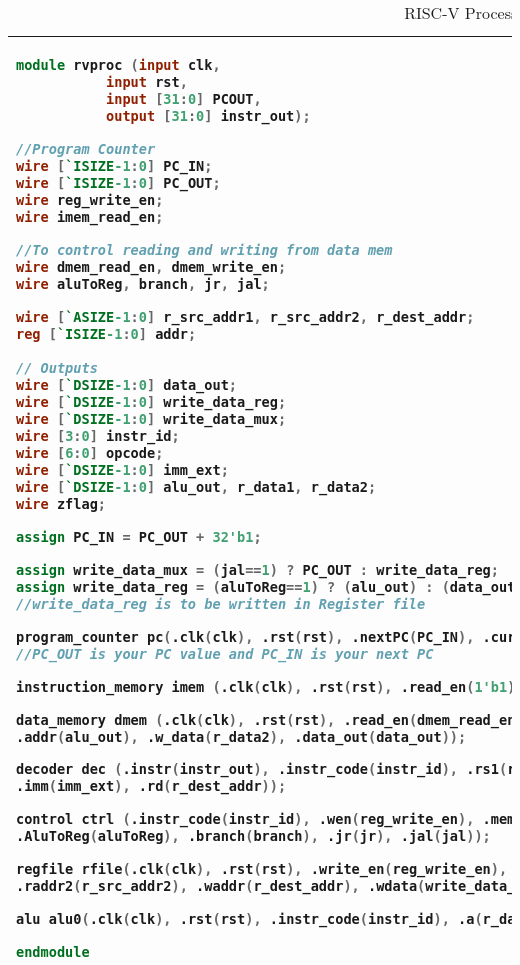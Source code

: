 \begin{table}[!h]
\centering
\caption{RISC-V Processor Top Level Unit}
\label{mem.tbl}
\begin{tabular}{l}
\toprule
\begin{lstlisting}[columns=fullflexible, language=Verilog]
module rvproc (input clk,
	       input rst,
	       input [31:0] PCOUT,
	       output [31:0] instr_out);

//Program Counter
wire [`ISIZE-1:0] PC_IN;
wire [`ISIZE-1:0] PC_OUT;
wire reg_write_en;
wire imem_read_en;

//To control reading and writing from data mem
wire dmem_read_en, dmem_write_en;
wire aluToReg, branch, jr, jal;

wire [`ASIZE-1:0] r_src_addr1, r_src_addr2, r_dest_addr;
reg [`ISIZE-1:0] addr;
 
// Outputs
wire [`DSIZE-1:0] data_out;
wire [`DSIZE-1:0] write_data_reg;
wire [`DSIZE-1:0] write_data_mux;
wire [3:0] instr_id;
wire [6:0] opcode;
wire [`DSIZE-1:0] imm_ext;
wire [`DSIZE-1:0] alu_out, r_data1, r_data2;
wire zflag;

assign PC_IN = PC_OUT + 32'b1;

assign write_data_mux = (jal==1) ? PC_OUT : write_data_reg;
assign write_data_reg = (aluToReg==1) ? (alu_out) : (data_out); 
//write_data_reg is to be written in Register file

program_counter pc(.clk(clk), .rst(rst), .nextPC(PC_IN), .currPC(PC_OUT)); 
//PC_OUT is your PC value and PC_IN is your next PC

instruction_memory imem (.clk(clk), .rst(rst), .read_en(1'b1), .r_addr(PC_OUT), .instr_out(instr_out));

data_memory dmem (.clk(clk), .rst(rst), .read_en(dmem_read_en), .write_en(dmem_write_en), 
.addr(alu_out), .w_data(r_data2), .data_out(data_out));

decoder dec (.instr(instr_out), .instr_code(instr_id), .rs1(r_src_addr1), .rs2(r_src_addr2), 
.imm(imm_ext), .rd(r_dest_addr));

control ctrl (.instr_code(instr_id), .wen(reg_write_en), .mem_read(dmem_read_en), .mem_write(dmem_write_en), 
.AluToReg(aluToReg), .branch(branch), .jr(jr), .jal(jal));

regfile rfile(.clk(clk), .rst(rst), .write_en(reg_write_en), .raddr1(r_src_addr1), 
.raddr2(r_src_addr2), .waddr(r_dest_addr), .wdata(write_data_reg), .rdata1(r_data1), .rdata2(r_data2));

alu alu0(.clk(clk), .rst(rst), .instr_code(instr_id), .a(r_data1), .b(r_data2), .imm(imm_ext), .out(alu_out), .zero(zflag));

endmodule
\end{lstlisting}
\\
\bottomrule
\end{tabular}
\end{table}